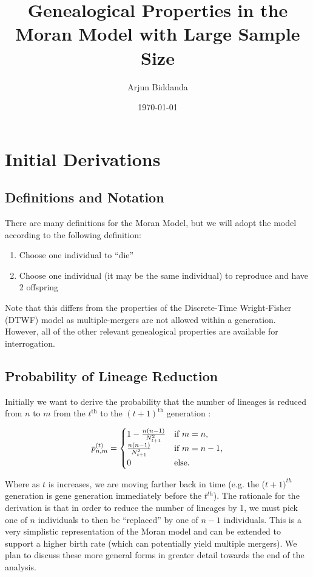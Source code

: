 \documentclass[11pt, twocolumn]{article}
\title{Genealogical Properties in the Moran Model with Large Sample Size}
\author{Arjun Biddanda}
\date{\today}
\begin{document}
\maketitle

\section{Initial Derivations}

\subsection{Definitions and Notation}

There are many definitions for the Moran Model, but we will adopt the model according to the following definition:

\begin{enumerate}
	\item Choose one individual to ``die''
	\item Choose one individual (it may be the same individual) to reproduce and have 2 offspring
\end{enumerate}

Note that this differs from the properties of the Discrete-Time Wright-Fisher (DTWF) model as multiple-mergers are not allowed within a generation. However, all of the other relevant genealogical properties are available for interrogation. 

\subsection{Probability of Lineage Reduction}
Initially we want to derive the probability that the number of lineages is reduced from $n$ to $m$ from the $t^{\text{th}}$ to the $(t+1)^{\text{th}}$ generation :

\begin{equation}
	p^{(t)}_{n,m} = 
	\begin{cases} 1 - \frac{n(n-1)}{N^2_{t+1}}  & \text{if $m = n$,}
		\\
		\frac{n(n-1)}{N^2_{t+1}} &\text{if $ m = n - 1$,}
		\\
		0 &\text{else.}
	\end{cases}
\end{equation}

Where as $t$ is increases, we are moving farther back in time (e.g. the ($t+1)^{th}$ generation is gene generation immediately before the $t^{th}$). The rationale for the derivation is that in order to reduce the number of lineages by 1, we must pick one of $n$ individuals to then be ``replaced'' by one of $n-1$ individuals. This is a very simplistic representation of the Moran model and can be extended to support a higher birth rate (which can potentially yield multiple mergers). We plan to discuss these more general forms in greater detail towards the end of the analysis. 
\end{document}
